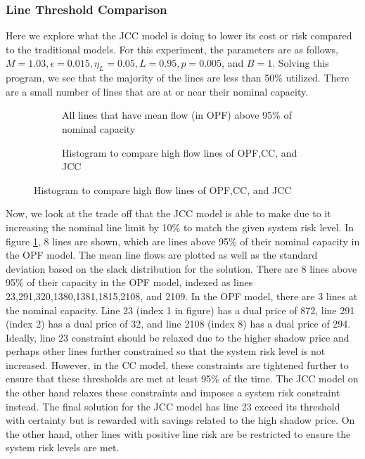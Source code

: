 \subsubsection*{Line Threshold Comparison}
Here we explore what the JCC model is doing to lower its cost or risk compared to the traditional models.  For this experiment, the parameters are as follows, $M=1.03, \epsilon=0.015, \eta_L=0.05, L=0.95, p=0.005$, and $B=1$.  Solving this program, we see that the majority of the lines are less than 50\% utilized.  There are a small number of lines that are at or near their nominal capacity.


\begin{figure}
\centering
\begin{subfigure}[b]{0.4\textwidth}

\caption{All lines that have mean flow (in OPF) above 95\% of nominal capacity}\label{solve_shadow}
\end{subfigure}
\hspace{15px}
\begin{subfigure}[b]{0.4\textwidth}
\centering

\caption{Histogram to compare high flow lines of OPF,CC, and JCC}\label{histogram}
\end{subfigure}
\end{figure}

Now, we look at the trade off that the JCC model is able to make due to it increasing the nominal line limit by 10\% to match the given system risk level.  In figure \ref{solve_shadow}, 8 lines are shown, which are lines above 95\% of their nominal capacity in the OPF model.  The mean line flows are plotted as well as the standard deviation based on the slack distribution for the solution.   There are 8 lines above 95\% of their capacity in the OPF model, indexed as lines 23,291,320,1380,1381,1815,2108, and 2109. In the OPF model, there are 3 lines at the nominal capacity.  Line 23 (index 1 in figure) has a dual price of 872, line 291 (index 2) has a dual price of 32, and line 2108 (index 8) has a dual price of 294.  Ideally, line 23 constraint should be relaxed due to the higher shadow price and perhaps other lines further constrained so that the system risk level is not increased. However, in the CC model, these constraints are tightened further to ensure that these thresholds are met at least 95\% of the time.  The JCC model on the other hand relaxes these constraints and imposes a system risk constraint instead.  The final solution for the JCC model has line 23 exceed its threshold with certainty but is rewarded with savings related to the high shadow price.  On the other hand, other lines with positive line risk are be restricted to ensure the system risk levels are met.

